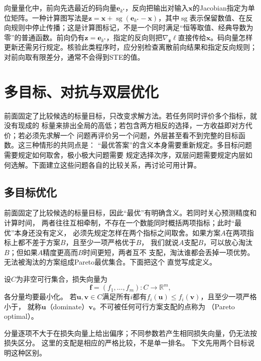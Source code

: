 向量量化中，前向先选最近的码向量$\bm e_{k^\star}$，反向把输出对输入$\bm x$的Jacobian指定为单位矩阵。一种计算图写法是$\bm z=\bm x+\operatorname{sg}(\bm e_{k^\star}-\bm x)$，其中$\operatorname{sg}$表示保留数值、在反向规则中停止传播；这是计算图标记，不是一个同时满足“恒等取值、经典导数为零”的普通函数。前向仍有$\bm z=\bm e_{k^\star}$，指定的反向则把$\nabla_{\bm z}\ell$直接传给$\bm x$。码向量怎样更新还需另行规定。核验此类程序时，应分别检查离散前向结果和指定反向规则；对前向取有限差分，通常不会得到STE的值。


\section{多目标、对抗与双层优化}
\label{sec:opt-decomposition-multiple-levels}

前面固定了比较候选的标量目标，只改变求解方法。若任务同时评价多个指标，就没有现成的
标量来排出全局的高低；若包含两方相反的选择，一方收益即对方代价；若必须先求解一个
问题再评价另一个问题，外层甚至看不到完整的目标函数。这三种情形的共同点是：
“最优答案”的含义本身需要重新规定。多目标问题需要规定如何取舍，极小极大问题需要
规定选择次序，双层问题需要规定内层如何选解。下面建立这些问题各自的比较关系，再讨论可用计算。

\subsection{多目标优化}
\label{sec:opt-multiobjective-saddle}

前面固定了比较候选的标量目标，因此“最优”有明确含义。若同时关心预测精度和计算时间，
两者往往互相牵制，不存在一个数能同时概括两项指标；此时“最优”本身还没有定义，
必须先规定怎样在两个指标之间取舍。如果方案$A$在两项指标上都不差于方案$B$，且至少一项严格优于$B$，
我们就说$A$支配$B$，可以放心淘汰$B$；但如果$A$精度更高而$B$时间更短，两者互不
支配，淘汰谁都会丢掉一项优势。无法被淘汰的方案组成Pareto最优集合。下面把这个
直觉写成定义。
\begin{definition}[支配与Pareto最优]
\label{def:opt-pareto-optimality}
设$C$为非空可行集合，损失向量为
\[
 \bm f=(f_1,\ldots,f_m):C\to\mathbb R^m,
\]
各分量均要最小化。
若$\bm u,\bm v\in C$满足所有$i$都有$f_i(\bm u)\leq f_i(\bm v)$，且至少一项严格小于，
就称$\bm u$（dominate）$\bm v$。不可被任何可行方案支配的点称为
（Pareto optimal）。
\end{definition}
分量逐项不大于在损失向量上给出偏序；不同参数若产生相同损失向量，仍无法按损失区分。
这里的支配是相应的严格比较，不是单一排名。
下文先用两个目标说明这种区别。

